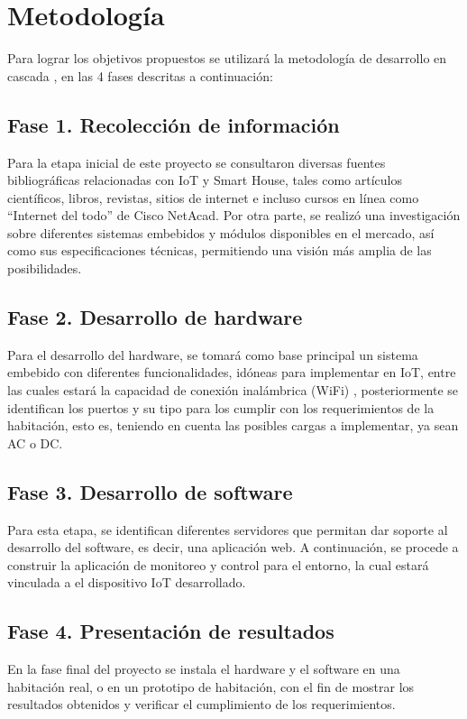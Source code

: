 \chapter{Metodología}

Para lograr los objetivos propuestos se utilizará la metodología de desarrollo en cascada \cite{Moha}, en las 4 fases descritas a continuación:

\section{Fase 1. Recolección de información} 
	Para la etapa inicial de este proyecto se consultaron diversas fuentes bibliográficas relacionadas con IoT y Smart House, tales como artículos científicos, libros, revistas, sitios de internet e incluso cursos en línea como “Internet del todo” de Cisco NetAcad. Por otra parte, se realizó una investigación sobre diferentes sistemas embebidos y módulos disponibles en el mercado, así como sus especificaciones técnicas, permitiendo una visión más amplia de las posibilidades. \\

\section{Fase 2. Desarrollo de hardware}
	Para el desarrollo del hardware, se tomará como base principal un sistema embebido con diferentes funcionalidades, idóneas para implementar en IoT, entre las cuales estará la capacidad de conexión inalámbrica (WiFi) , posteriormente se identifican los puertos y su tipo para los cumplir con los requerimientos de la habitación, esto es, teniendo en cuenta las posibles cargas a implementar, ya sean AC o DC. \\

\section{Fase 3. Desarrollo de software}
	Para esta etapa, se identifican diferentes servidores que permitan dar soporte al desarrollo del software, es decir, una aplicación web. A continuación, se procede a construir la aplicación de monitoreo y control para el entorno, la cual estará vinculada a el dispositivo IoT desarrollado.\\

\section{Fase 4. Presentación de resultados} 
	En la fase final del proyecto se instala el hardware y el software en una habitación real, o en un prototipo de habitación, con el fin de mostrar los resultados obtenidos y verificar el cumplimiento de los requerimientos.\\